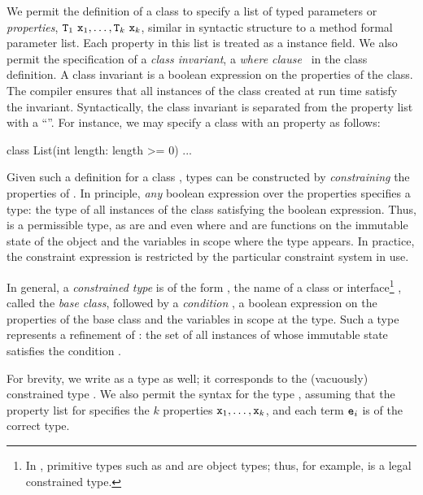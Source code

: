 We permit the definition of a class  to specify
a list of typed parameters or {\em properties},
${\tt T}_1~{\tt x}_1, \dots, {\tt T}_k~{\tt x}_k$,
similar in syntactic structure to a method formal parameter list.
%
Each property in this list is treated as  a   instance field.
%
We also permit the
specification of a {\em class invariant}, a
{\em where clause}~\cite{where-clauses}
in the class definition. A class invariant
is a boolean expression on the properties of the class.
The compiler ensures that all
instances of the class created at run time satisfy the invariant.
%
Syntactically, the class invariant is separated from the
property list with a ``\xcd{:}''. 
%
For instance, we may specify a class  with an
 property as follows:
\begin{displayxten}
class List(int length: length >= 0) {...}
\end{displayxten}
Given such a definition for a class , types can be
constructed by {\em constraining} the properties of .  In
principle, {\em any} boolean expression over the properties
specifies a type: the type of all instances of the class
satisfying the boolean expression. Thus, 
is a permissible type, as are  and
even  where  and 
are functions on the immutable state of the  object
and the variables in scope where the type appears.
In practice, the constraint expression is restricted by the
particular constraint system in use.

In general, a {\em constrained type} is of the form ,
the name of a class or interface\footnote{In \Xten{}, primitive
types such as  and  are object types; thus,
for example,  is a legal constrained type.}
, called the {\em base class}, followed
by a {\em condition} ,
a boolean expression on the properties of the
base class and the  variables in scope at the type.
Such a type represents a refinement of : the set of all
instances of  whose immutable state satisfies the
condition .

For brevity, we write  as a type as well; it
corresponds to the (vacuously) constrained type .
We also permit the syntax
 for
the type
,
assuming that
the property list for  specifies the $k$ properties
${\tt x}_1,\ldots,{\tt x}_k$,
and each term ${\tt e}_i$ is of the correct type.

